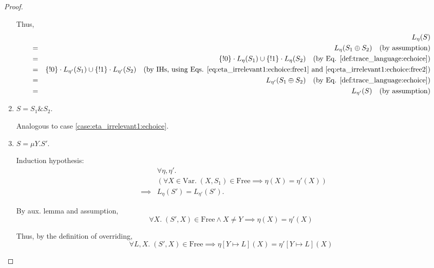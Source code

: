 \documentclass{llncs}
\newcommand*{\Var}{\mathrm{Var}}
\newcommand*{\Free}{\mathrm{Free}}
\newcommand*{\send}{\mathord{!}}
\newcommand*{\echoice}{\oplus}
\newcommand*{\ichoice}{\mathop{\&}}
\newcommand*{\concat}{\cdot}
\renewcommand*{\|}{\;|\;}
\begin{document}
\begin{proof}
\begin{enumerate}
      Thus,
      \begin{eqnarray*}
        &&  L_\eta(S) \\
        &=& L_\eta(S_1 \echoice S_2)
        \quad \text{(by assumption)} \\
        &=& \{\send 0\} \concat L_\eta(S_1) \cup \{\send 1\} \concat L_\eta(S_2)
        \quad \text{(by Eq. \ref{def:trace_language:echoice})} \\
        &=& \{\send 0\} \concat L_{\eta'}(S_1) \cup \{\send 1\} \concat L_{\eta'}(S_2)
        \quad \text{(by IHs, using Eqs. \ref{eq:eta_irrelevant1:echoice:free1} and \ref{eq:eta_irrelevant1:echoice:free2})} \\
        &=& L_{\eta'}(S_1 \echoice S_2)
        \quad \text{(by Eq. \ref{def:trace_language:echoice})} \\
        &=&  L_{\eta'}(S)
        \quad \text{(by assumption)}
      \end{eqnarray*}

    \item
      \label{case:eta_irrelevant1:ichoice}
      $S = S_1 \ichoice S_2$.

      Analogous to case \ref{case:eta_irrelevant1:echoice}.

    \item
      \label{case:eta_irrelevant1:mu}
      $S = \mu Y.S'$.

      Induction hypothesis:
      \begin{eqnarray*}
        &&         \forall \eta, \eta'.\; \\
        &&         (\forall X \in \Var.\; (X, S_1) \in \Free \implies \eta(X) = \eta'(X)) \\
        &\implies& L_\eta(S') = L_{\eta'}(S').
      \end{eqnarray*}

      By aux. lemma and assumption,
      \begin{equation}
        \label{eq:eta_irrelevant1:mu:free1}
        \forall X.\; (S', X) \in \Free \land X \neq Y \implies \eta(X) = \eta'(X)
      \end{equation}

      Thus, by the definition of overriding,
      \begin{equation}
        \label{eq:eta_irrelevant1:mu:free2}
        \forall L, X.\; (S', X) \in \Free \implies \eta[Y \mapsto L](X) = \eta'[Y \mapsto L](X)
      \end{equation}


\end{enumerate}
\end{proof}
\end{document}
